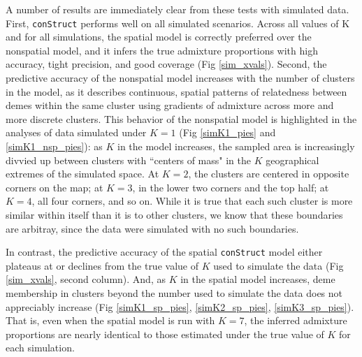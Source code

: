 \documentclass[12pt]{article}
\newcommand{\gb}[1]{{\it\color{magenta}{(#1)}}}
\newcommand{\plr}[1]{{\it\color{purple}{(#1)}}}
\begin{document}
A number of results are immediately clear from these tests with simulated data.
First, \texttt{conStruct} performs well on all simulated scenarios.
Across all values of K and for all simulations, 
the spatial model is correctly preferred over the nonspatial model, 
and it infers the true admixture proportions with high accuracy, tight precision, and good coverage 
(Fig \ref{sim_xvals}).
Second, the predictive accuracy of the nonspatial model increases 
with the number of clusters in the model, 
as it describes continuous, spatial patterns of relatedness between demes within the same cluster 
using gradients of admixture across more and more discrete clusters.
This behavior of the nonspatial model is highlighted in 
the analyses of data simulated under $K=1$ (Fig \ref{simK1_pies} and \ref{simK1_nsp_pies}):
as $K$ in the model increases, 
the sampled area is increasingly divvied up between clusters 
with ``centers of mass" in the $K$ geographical extremes of the simulated space.
At $K=2$, the clusters are centered in opposite corners on the map; 
at $K=3$, in the lower two corners and the top half; 
at $K=4$, all four corners, and so on.
\plr{Need a concluding sentence, maybe like this?}
While it is true that each such cluster is more similar within itself
than it is to other clusters,
we know that these boundaries are arbitray,
since the data were simulated with no such boundaries.

In contrast, the predictive accuracy of the spatial \texttt{conStruct} model
either plateaus at or declines from the true value of $K$ used to simulate the data (Fig \ref{sim_xvals}, second column).
And, as $K$ in the spatial model increases, 
deme membership in clusters beyond the number used to simulate the data does not appreciably increase 
(Fig \ref{simK1_sp_pies}, \ref{simK2_sp_pies}, \ref{simK3_sp_pies}).
That is, even when the spatial model is run with $K=7$, 
the inferred admixture proportions are nearly identical to 
those estimated under the true value of $K$ for each simulation.

\gb{could talk about proportion of relatedness explained by each layer here.
e.g., Another way to visualize the difference in the behavior of the spatial and nonspatial models 
is to summarize the proportion of relatedness between samples explained by each cluster...}
\end{document}
